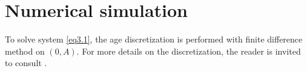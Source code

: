 \documentclass[10pt, a4paper]{amsart}
\theoremstyle{plain}
\theoremstyle{definition}
\theoremstyle{remark}
\numberwithin{equation}{section}
\begin{document}
\section*{\bf Numerical simulation}\label{s35}
To solve system \eqref{eq3.1}, the age discretization is performed with finite difference method on $(0,A).$ For more details on the discretization, the reader is invited to consult \cite{ref58, ref57}.  %
\end{document}
